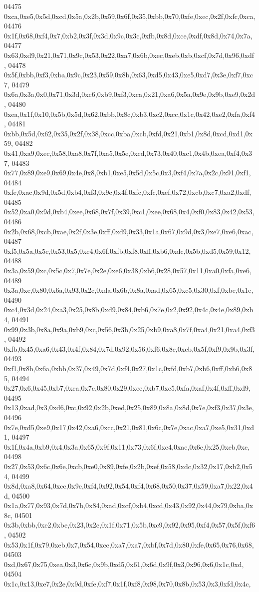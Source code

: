 \begin{DoxyCode}
04475   0xca,0xe5,0x5d,0xcd,0x5a,0x2b,0x59,0x6f,0x35,0xbb,0x70,0xfe,0xec,0x2f,0xfc,0xca,
04476   0x1f,0x68,0xf4,0x7,0xb2,0x3f,0x3d,0x9c,0x3c,0xfb,0x8d,0xce,0xdf,0x8d,0x74,0x7a,
04477   0x63,0xd9,0x21,0x71,0x9c,0x53,0x22,0xa7,0x6b,0xec,0xeb,0xb,0xcf,0x7d,0x96,0xdf,
04478   0x5f,0xbb,0xf3,0xba,0x9c,0x23,0x59,0x8b,0x63,0xd5,0x43,0xe5,0xd7,0x3e,0xf7,0xc7,
04479   0x6a,0x3a,0x0,0x71,0x3d,0xc6,0xb9,0xf3,0xca,0x21,0xa6,0x5a,0x9e,0x9b,0xe9,0x2d,
04480   0xea,0x1f,0x10,0x5b,0x5d,0x62,0xbb,0x8c,0xb3,0xc2,0xcc,0x1c,0x42,0xe2,0xfa,0xf4,
04481   0xbb,0x5d,0x62,0x35,0x2f,0x38,0xcc,0xba,0xcb,0xfd,0x21,0xb1,0x8d,0xcd,0xd1,0x59,
04482   0x41,0xa9,0xec,0x58,0xa8,0x7f,0xa5,0x5e,0xcd,0x73,0x40,0xc1,0x4b,0xea,0xf4,0x37,
04483   0x77,0x89,0xe9,0x69,0x4e,0x8,0xb1,0xe5,0x5d,0x5c,0x3,0xf4,0x7a,0x2c,0x91,0xf1,
04484   0xfe,0xac,0x9d,0x5d,0xb4,0xf3,0x9c,0x4f,0xfc,0xfc,0xef,0x72,0xcb,0xc7,0xa2,0xdf,
04485   0x52,0xa0,0x9d,0xb4,0xee,0x68,0x7f,0x39,0xc1,0xee,0x68,0x4,0xf0,0x83,0x42,0x53,
04486   0x2b,0x68,0xcb,0xae,0x2f,0x3e,0xff,0xd9,0x33,0x1a,0x67,0x9d,0x3,0xe7,0xe6,0xac,
04487   0xf5,0x5a,0x5c,0x53,0x5,0xc4,0x6f,0xfb,0xf8,0xff,0xb6,0xdc,0x5b,0xd5,0x59,0x12,
04488   0x3a,0x59,0xc,0x5c,0x7,0x7e,0x2e,0xe6,0x38,0xb6,0x28,0x57,0x11,0xa0,0xfa,0xe6,
04489   0x3a,0xe,0x80,0x6a,0x93,0x2c,0xda,0x6b,0x8a,0xad,0x65,0xc5,0x30,0xf,0xbe,0x1e,
04490   0xc4,0x3d,0x24,0xa3,0x25,0x8b,0xd9,0x84,0xb6,0x7e,0x2,0x92,0x4c,0x4e,0x89,0xb4,
04491   0x99,0x3b,0x8a,0x9a,0xb9,0xc,0x56,0x3b,0x25,0xb9,0xa8,0x7f,0xa4,0x21,0xa4,0xf3,
04492   0xfb,0x45,0xa6,0x43,0x4f,0x84,0x7d,0x92,0x56,0xf6,0x8e,0xcb,0x5f,0xf9,0x9b,0x3f,
04493   0xf1,0x8b,0x6a,0xbb,0x37,0x49,0x7d,0xf4,0x27,0x1c,0xfd,0xb7,0xb6,0xff,0xb6,0x85,
04494   0x27,0x6,0x45,0xb7,0xca,0x7c,0x80,0x29,0xee,0xb7,0xc5,0xfa,0xaf,0x4f,0xff,0xd9,
04495   0x13,0xad,0x3,0xd6,0xc,0x92,0x2b,0xed,0x25,0x89,0x8a,0x8d,0x7e,0xf3,0x37,0x3e,
04496   0x7e,0xd5,0xe9,0x17,0x42,0xa6,0xcc,0x21,0x81,0x6c,0x7e,0xac,0xa7,0xe5,0x31,0xd1,
04497   0x1f,0x4a,0xb9,0x4,0x3a,0x65,0x9f,0x11,0x73,0x6f,0xe4,0xae,0x6e,0x25,0xeb,0xc,
04498   0x27,0x53,0x6c,0x6e,0xcb,0xe0,0x89,0xfe,0x2b,0xef,0x58,0xdc,0x32,0x17,0xb2,0x54,
04499   0x8d,0xa8,0x64,0xcc,0x9e,0xf4,0x92,0x54,0xf4,0x68,0x50,0x37,0x59,0xa7,0x22,0x4d,
04500   0x1a,0x77,0x93,0x7d,0x7b,0x84,0xad,0xcf,0xb4,0xcd,0x43,0x92,0x44,0x79,0xba,0x8c,
04501   0x3b,0xbb,0xe2,0xbe,0x23,0x2c,0x1f,0x71,0x5b,0xc9,0x92,0x95,0xf4,0x57,0x5f,0xf6,
04502   0x53,0x1f,0x79,0xeb,0x7,0x54,0xcc,0xa7,0xa7,0xbf,0x7d,0x80,0xfe,0x65,0x76,0x68,
04503   0xd,0x67,0x75,0xea,0x3,0x6c,0x9b,0xd5,0x61,0x6d,0x9f,0x3,0x96,0x6,0x1c,0xd,
04504   0x1c,0x13,0xe7,0x2e,0x9d,0xfe,0xf7,0x1f,0xf8,0x98,0x70,0x8b,0x53,0x3,0xfd,0x4c,

\end{DoxyCode}
